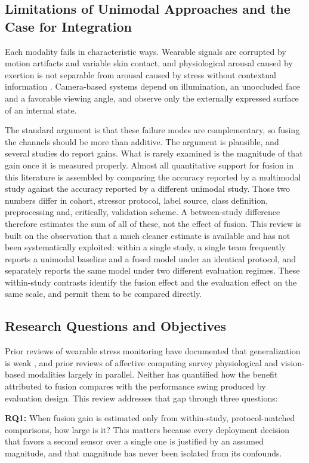 \subsection{Limitations of Unimodal Approaches and the Case for Integration}
Each modality fails in characteristic ways. Wearable signals are corrupted by motion
artifacts and variable skin contact, and physiological arousal caused by exertion is not
separable from arousal caused by stress without contextual information \cite{r19,r79}.
Camera-based systems depend on illumination, an unoccluded face and a favorable viewing
angle, and observe only the externally expressed surface of an internal state.

The standard argument is that these failure modes are complementary, so fusing the channels
should be more than additive. The argument is plausible, and several studies do report gains.
What is rarely examined is the magnitude of that gain once it is measured properly. Almost
all quantitative support for fusion in this literature is assembled by comparing the accuracy
reported by a multimodal study against the accuracy reported by a different unimodal study.
Those two numbers differ in cohort, stressor protocol, label source, class definition,
preprocessing and, critically, validation scheme. A between-study difference therefore
estimates the sum of all of these, not the effect of fusion. This review is built on the
observation that a much cleaner estimate is available and has not been systematically
exploited: within a single study, a single team frequently reports a unimodal baseline and a
fused model under an identical protocol, and separately reports the same model under two
different evaluation regimes. These within-study contrasts identify the fusion effect and the
evaluation effect on the same scale, and permit them to be compared directly.

\subsection{Research Questions and Objectives}
Prior reviews of wearable stress monitoring have documented that generalization is weak
\cite{r118}, and prior reviews of affective computing survey physiological and vision-based
modalities largely in parallel. Neither has quantified how the benefit attributed to fusion
compares with the performance swing produced by evaluation design. This review addresses that
gap through three questions:

\textbf{RQ1:} When fusion gain is estimated only from within-study, protocol-matched
comparisons, how large is it? This matters because every deployment decision that favors a
second sensor over a single one is justified by an assumed magnitude, and that magnitude has
never been isolated from its confounds.

